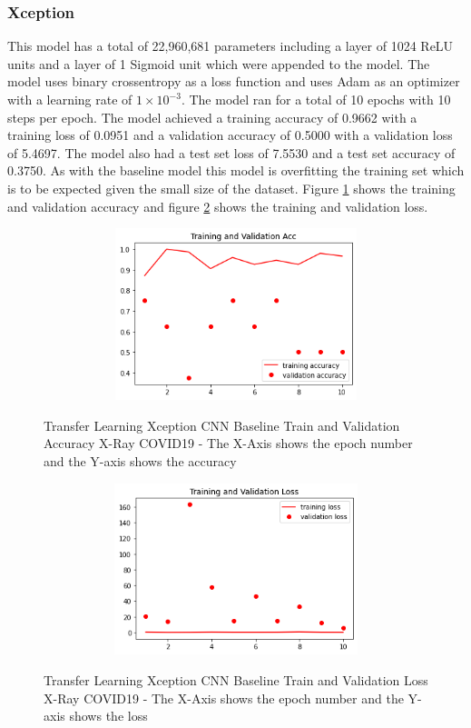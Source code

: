 \subsubsection{Xception}
This model has a total of 22,960,681 parameters including a layer of 1024 ReLU units and a layer of 1 Sigmoid unit which were appended to the model. The model uses binary crossentropy as a loss function and uses Adam as an optimizer with a learning rate of $1\times10^{-3}$. 
The model ran for a total of 10 epochs with 10 steps per epoch.  The model achieved a training accuracy of 0.9662 with a training loss of 0.0951 and a validation accuracy of 0.5000 with a validation loss of 5.4697.  The model also had a test set loss of 7.5530 and a test set accuracy of 0.3750.  As with the baseline model this model is overfitting the training set which is to be expected given the small size of the dataset.  Figure \ref{fig:Xception CNN Baseline Train and Validation Accuracy X-Ray COVID19} shows the training and validation accuracy and figure \ref{fig:Xception CNN Baseline Train and Validation Loss X-Ray COVID19} shows the training and validation loss. 
 \begin{figure}[H]
    \centering
    \includegraphics[width=1\textwidth,height=5cm,keepaspectratio]{Images/XceptionBaselineTrainingValidationAccuracyXRayCOVID19.png}\\
    \caption{Transfer Learning Xception CNN Baseline Train and Validation Accuracy X-Ray COVID19 - The X-Axis shows the epoch number and the Y-axis shows the accuracy}
    \label{fig:Xception CNN Baseline Train and Validation Accuracy X-Ray COVID19}
\end{figure}
 \begin{figure}[H]
    \centering
    \includegraphics[width=1\textwidth,height=5cm,keepaspectratio]{Images/XceptionBaselineTrainingValidationLossXRayCOVID19.png}\\
    \caption{Transfer Learning Xception CNN Baseline Train and Validation Loss X-Ray COVID19 - The X-Axis shows the epoch number and the Y-axis shows the loss}
    \label{fig:Xception CNN Baseline Train and Validation Loss X-Ray COVID19}
\end{figure}

